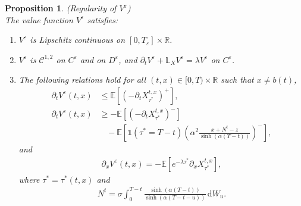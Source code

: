 \documentclass{tufte-handout}
\newcommand{\E}{\mathbb{E}} %
\newcommand{\R}{\mathbb{R}} %
\newtheorem{pr}{Proposition}
\begin{document}
	
	
	\begin{pr}(Regularity of $V^\varepsilon$)\label{pr:V^eps_regularity}\\
		The value function $V^\varepsilon$ satisfies:
		\begin{enumerate}[label=(\roman{*}), ref=(\textit{\roman{*}})]
			\item \label{pr:V^eps_Lcontinuous} $V^\varepsilon$ is Lipschitz continuous on $[0, T_\varepsilon]\times\R$. 
			\item \label{pr:V^eps_C^12onC} $V^\varepsilon$ is $\mathcal{C}^{1,2}$ on $C^\varepsilon$ and on $D^\varepsilon$, and $\partial_tV^\varepsilon + \mathbb{L}_{X}V^\varepsilon = \lambda V^\varepsilon$ on $C^\varepsilon$. 
			\item \label{pr:V^eps_x-V^eps_t} The following relations hold for all $(t, x) \in [0, T)\times\R$ such that $x\neq b(t)$,
			\begin{align}
			\partial_t V^\varepsilon(t, x) &\leq \E\left[\left(-\partial_t X_{\tau^*}^{t, x}\right)^+\right], \label{eq:V^epst_up} \\		
			\partial_t V^\varepsilon(t, x) &\geq - \E\left[\left(-\partial_t X_{\tau^*}^{t, x}\right)^-\right] \nonumber \\
			&\ \ \ \ - \E\left[\mathbb{1}(\tau^* = T - t)\left(\alpha^2\frac{x + N^t - z}{\sinh(\alpha (T - t))}\right)^-\right], \label{eq:V^epst_low}
			\end{align}
			and
			\begin{align}\label{eq:V^eps_x}
			\partial_xV^\varepsilon(t, x) = -\E\left[e^{-\lambda\tau^*}\partial_x X_{\tau^*}^{t, x}\right],
			\end{align} 
			where $\tau^* = \tau^*(t, x)$ and
			\begin{align}\label{eq:N^eps^t}
			N^t = \sigma\int_{0}^{T - t} \frac{\sinh(\alpha (T - t))}{\sinh(\alpha (T - t - u))}\,\mathrm{d}W_u. 
			\end{align} 			
		\end{enumerate}
	\end{pr}
	
\end{document}

